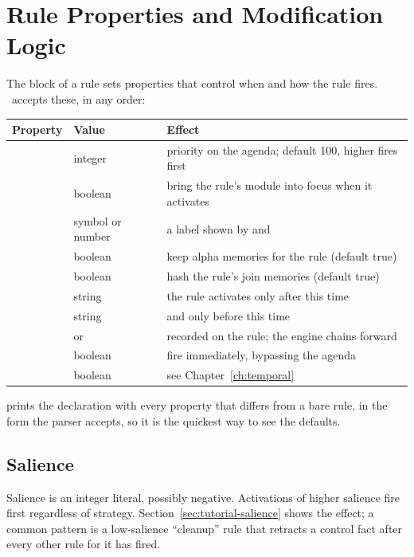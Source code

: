\chapter{Rule Properties and Modification Logic}
\label{ch:rule-properties}

The  block of a rule sets properties that control when and
how the rule fires. \Morendo\ accepts these, in any order:

\begin{center}
\begin{tabularx}{\textwidth}{llL}
\toprule
Property & Value & Effect \\
\midrule
{} & integer & priority on the agenda; default 100, higher fires first \\
 & boolean & bring the rule's module into focus when it activates \\
 & symbol or number & a label shown by  and  \\
 & boolean & keep alpha memories for the rule (default true) \\
 & boolean & hash the rule's join memories (default true) \\
 & string & the rule activates only after this time \\
 & string & and only before this time \\
 &  or  & recorded on the rule; the engine chains forward \\
 & boolean & fire immediately, bypassing the agenda \\
 & boolean & see Chapter~\ref{ch:temporal} \\
\bottomrule
\end{tabularx}
\end{center}

 prints the declaration with every property that differs
from a bare rule, in the form the parser accepts, so it is the quickest
way to see the defaults.

\section{Salience}

Salience is an integer literal, possibly negative. Activations of higher
salience fire first regardless of strategy. Section~\ref{sec:tutorial-salience}
shows the effect; a common pattern is a low-salience ``cleanup'' rule
that retracts a control fact after every other rule for it has fired.

